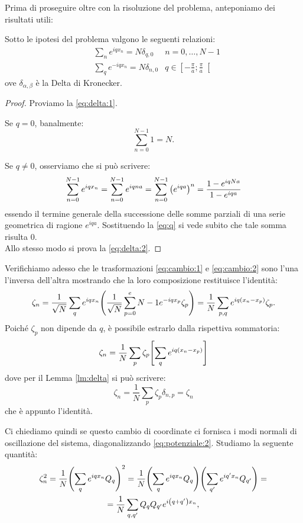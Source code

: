         \par Prima di proseguire oltre con la risoluzione del problema, anteponiamo dei risultati utili:
        \begin{lemma} \label{lm:delta}
            Sotto le ipotesi del problema valgono le seguenti relazioni:
            \begin{align}
                &\sum_{n}e^{iqx_n}=N\delta_{q,0} &n=0,\dots,N-1 \label{eq:delta:1}\\
                &\sum_{q}e^{-iqx_n}=N\delta_{n,0} &q\in\left[-\frac{\pi}{a};\frac{\pi}{a}\right[ \label{eq:delta:2}
            \end{align}
        ove $\delta_{\alpha,\beta}$ \`e la Delta di Kronecker.
        \end{lemma}
        \begin{proof}
            Proviamo la \eqref{eq:delta:1}. \par Se $q=0$, banalmente:
                $$\sum_{n=0}^{N-1}1=N.$$
            \par Se $q\neq0$, osserviamo che si pu\`o scrivere:
                $$\sum_{n=0}^{N-1} e^{iqx_n}=\sum_{n=0}^{N-1} e^{iqna}=\sum_{n=0}^{N-1}\qty(e^{iqa})^n=\frac{1-e^{iqNa}}{1-e^{iqa}}$$
            essendo il termine generale della successione delle somme parziali di una serie geometrica di ragione $e^{iqa}$. Sostituendo la \eqref{eq:q} si vede subito che tale somma risulta $0$. \\ Allo stesso modo si prova la \eqref{eq:delta:2}.
        \end{proof}
        \par Verifichiamo adesso che le trasformazioni \eqref{eq:cambio:1} e \eqref{eq:cambio:2} sono l'una l'inversa dell'altra mostrando che la loro composizione restituisce l'identit\`a: $$\zeta_n=\frac{1}{\sqrt{N}}\sum_{q}e^{iqx_n}\qty(\frac{1}{\sqrt{N}}\sum_{p=0}^e{N-1}e^{-iqx_p}\zeta_p)=\frac{1}{N}\sum_{p,q}e^{iq\qty(x_n-x_p)}\zeta_p.$$ Poich\'e $\zeta_p$ non dipende da $q$, \`e possibile estrarlo dalla rispettiva sommatoria:
            $$\zeta_n=\frac{1}{N}\sum_p\zeta_p\qty[\sum_q e^{iq\qty(x_n-x_p)}]$$
        dove per il Lemma \ref{lm:delta} si pu\`o scrivere:
            $$\zeta_n=\frac{1}{N}\sum_p\zeta_p\delta_{n,p}=\zeta_n$$
        che \`e appunto l'identit\`a. \par Ci chiediamo quindi se questo cambio di coordinate ci fornisca i modi normali di oscillazione del sistema, diagonalizzando \eqref{eq:potenziale:2}. Studiamo la seguente quantit\`a:
        \begin{multline*}
            \zeta_n^2=\frac{1}{N}\qty(\sum_q e^{iqx_n}Q_q)^2=\frac{1}{N}\qty(\sum_q e^{iqx_n}Q_q)\Biggl(\sum_{q'} e^{iq'x_n}Q_{q'}\Biggr)=\\=\frac{1}{N}\sum_{q,q'}Q_qQ_{q'}e^{i\qty(q+q')x_n},
        \end{multline*}
